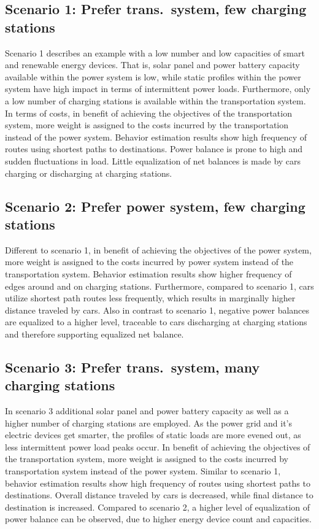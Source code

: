 \subsection*{Scenario 1: Prefer trans.\ system, few charging stations}
Scenario 1 describes an example with a low number and low capacities of smart and renewable energy devices. That is, solar panel and power battery capacity available within the power system is low, while static profiles within the power system have high impact in terms of intermittent power loads. Furthermore, only a low number of charging stations is available within the transportation system. In terms of costs, in benefit of achieving the objectives of the transportation system, more weight is assigned to the costs incurred by the transportation instead of the power system. Behavior estimation results show high frequency of routes using shortest paths to destinations. Power balance is prone to high and sudden fluctuations in load. Little equalization of net balances is made by cars charging or discharging at charging stations.

\subsection*{Scenario 2: Prefer power system, few charging stations}

Different to scenario 1, in benefit of achieving the objectives of the power system, more weight is assigned to the costs incurred by power system instead of the transportation system. Behavior estimation results show higher frequency of edges around and on charging stations. Furthermore, compared to scenario 1, cars utilize shortest path routes less frequently, which results in marginally higher distance traveled by cars. Also in contrast to scenario 1, negative power balances are equalized to a higher level, traceable to cars discharging at charging stations and therefore supporting equalized net balance.

\subsection*{Scenario 3: Prefer trans.\ system, many charging stations}

In scenario 3 additional solar panel and power battery capacity as well as a higher number of charging stations are employed. As the power grid and it's electric devices get smarter, the profiles of static loads are more evened out, as less intermittent power load peaks occur. In benefit of achieving the objectives of the transportation system, more weight is assigned to the costs incurred by transportation system instead of the power system. Similar to scenario 1, behavior estimation results show high frequency of routes using shortest paths to destinations. Overall distance traveled by cars is decreased, while final distance to destination is increased. Compared to scenario 2, a higher level of equalization of power balance can be observed, due to higher energy device count and capacities.

